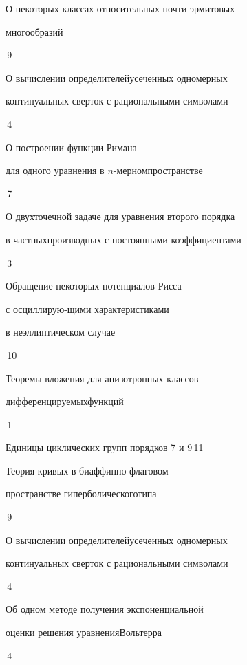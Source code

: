 {О некоторых классах относительных почти эрмитовых 


многообразий}{\No\,9}




{О вычислении определителей\newline усеченных одномерных 


континуальных сверток с рациональными символами}{\No\,4}




{О построении функции Римана


для одного уравнения в $n$-мерном\newline пространстве}{\No\,7}




{О двухточечной задаче для уравнения второго порядка 


в частных\newline производных с постоянными коэффициентами}{\No\,3}




{Обращение некоторых потенциалов Рисса 


с осциллирую-\newline щими характеристиками 


в неэллиптическом случае}{\No\,10}




{Теоремы вложения для анизотропных классов


дифференцируемых\newline функций}{\No\,1}




{Единицы циклических групп порядков 7 и 9}{\No\,11}




{Теория кривых в биаффинно-флаговом  


пространстве гиперболического\newline типа}{\No\,9}




{О вычислении определителей\newline усеченных одномерных 


континуальных сверток с рациональными символами}{\No\,4}




{Об одном методе получения экспоненциальной


оценки решения уравнения\newline Вольтерра}{\No\,4}


